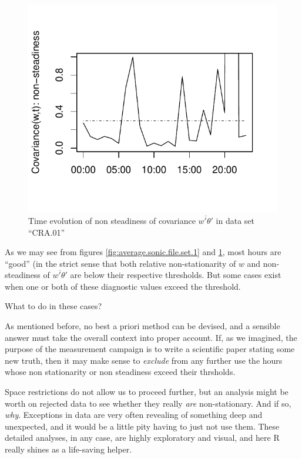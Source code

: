 \documentclass[a4paper,10pt]{book}
\begin{document}
\begin{figure}[htp]
 \centering
 \begin{center}
 \includegraphics[scale=1.1,keepaspectratio=true]{./diagrams/average_sonic_file_set_2.pdf}
 \end{center}
 \caption{Time evolution of non steadiness of covariance $\overline{w'\theta'}$ in data set ``CRA.01''}
 \label{fig:average.sonic.file.set.2}
\end{figure}

As we may see from figures \ref{fig:average.sonic.file.set.1} and \ref{fig:average.sonic.file.set.2}, most hours are ``good'' (in the strict sense that both relative non-stationarity of $w$ and non-steadiness of $\overline{w'\theta'}$ are below their respective thresholds. But some cases exist when one or both of these diagnostic values exceed the threshold.

What to do in these cases?

As mentioned before, no best a priori method can be devised, and a sensible answer must take the overall context into proper account. If, as we imagined, the purpose of the measurement campaign is to write a scientific paper stating some new truth, then it may make sense to \emph{exclude} from any further use the hours whose non stationarity or non steadiness exceed their thrsholds.

Space restrictions do not allow us to proceed further, but an analysis might be worth on rejected data to see whether they really \emph{are} non-stationary. And if so, \emph{why}. Exceptions in data are very often revealing of something deep and unexpected, and it would be a little pity having to just not use them. These detailed analyses, in any case, are highly exploratory and visual, and here R really shines as a life-saving helper.
\end{document}
